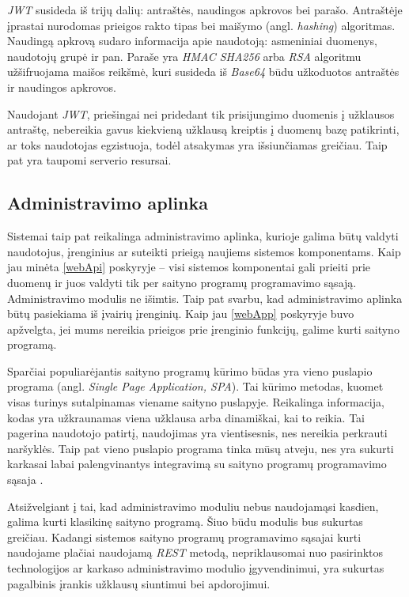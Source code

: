 \documentclass{VUMIFPSbakalaurinis}
\begin{document}
\textit{JWT} susideda iš trijų dalių: antraštės, naudingos apkrovos bei parašo. Antraštėje įprastai nurodomas prieigos rakto tipas bei maišymo (angl. \textit{hashing}) algoritmas. Naudingą apkrovą sudaro informacija apie naudotoją: asmeniniai duomenys, naudotojų grupė ir pan. Paraše yra \textit{HMAC SHA256} arba \textit{RSA} algoritmu užšifruojama maišos reikšmė, kuri susideda iš \textit{Base64} būdu užkoduotos antraštės ir naudingos apkrovos.

Naudojant \textit{JWT}, priešingai nei pridedant tik prisijungimo duomenis į užklausos antraštę, nebereikia gavus kiekvieną užklausą kreiptis į duomenų bazę patikrinti, ar toks naudotojas egzistuoja, todėl atsakymas yra išsiunčiamas greičiau. Taip pat yra taupomi serverio resursai. 

\subsection{Administravimo aplinka}

Sistemai taip pat reikalinga administravimo aplinka, kurioje galima būtų valdyti naudotojus, įrenginius ar suteikti prieigą naujiems sistemos komponentams. Kaip jau minėta \ref{webApi} poskyryje – visi sistemos komponentai gali prieiti prie duomenų ir juos valdyti tik per saityno programų programavimo sąsają. Administravimo modulis ne išimtis. Taip pat svarbu, kad administravimo aplinka būtų pasiekiama iš įvairių įrenginių. Kaip jau \ref{webApp} poskyryje buvo apžvelgta, jei mums nereikia prieigos prie įrenginio funkcijų, galime kurti saityno programą.

Sparčiai populiarėjantis saityno programų kūrimo būdas yra vieno puslapio programa (angl. \textit{Single Page Application, SPA}). Tai kūrimo metodas, kuomet visas turinys sutalpinamas viename saityno puslapyje. Reikalinga informacija, kodas yra užkraunamas viena užklausa arba dinamiškai, kai to reikia. Tai pagerina naudotojo patirtį, naudojimas yra vientisesnis, nes nereikia perkrauti naršyklės. Taip pat vieno puslapio programa tinka mūsų atveju, nes yra sukurti karkasai labai palengvinantys integravimą su saityno programų programavimo sąsaja \cite{spa}.

Atsižvelgiant į tai, kad administravimo moduliu nebus naudojamąsi kasdien, galima kurti klasikinę saityno programą. Šiuo būdu modulis bus sukurtas greičiau. Kadangi sistemos saityno programų programavimo sąsajai kurti naudojame plačiai naudojamą \textit{REST} metodą, nepriklausomai nuo pasirinktos technologijos ar karkaso administravimo modulio įgyvendinimui, yra sukurtas pagalbinis įrankis užklausų siuntimui bei apdorojimui.
\end{document}
